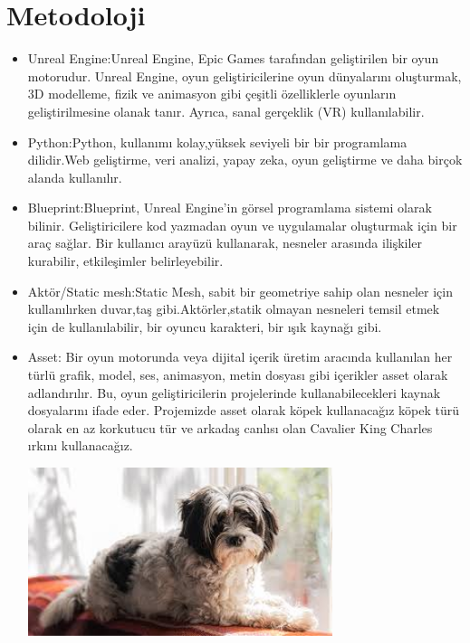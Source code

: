 \documentclass[12pt,a4paper]{article}
\begin{document}
		\section{Metodoloji} 
		\begin{itemize}
			\item Unreal Engine:Unreal Engine, Epic Games tarafından geliştirilen bir oyun motorudur. Unreal Engine, oyun geliştiricilerine oyun dünyalarını oluşturmak, 3D modelleme, fizik ve animasyon gibi çeşitli özelliklerle oyunların geliştirilmesine olanak tanır. Ayrıca, sanal gerçeklik (VR) kullanılabilir. 
			\item Python:Python, kullanımı kolay,yüksek seviyeli bir bir programlama dilidir.Web geliştirme, veri analizi, yapay zeka, oyun geliştirme ve daha birçok alanda kullanılır. 
			\item Blueprint:Blueprint, Unreal Engine'in görsel programlama sistemi olarak bilinir. Geliştiricilere kod yazmadan oyun ve uygulamalar oluşturmak için bir araç sağlar. Bir kullanıcı arayüzü kullanarak, nesneler arasında ilişkiler kurabilir, etkileşimler belirleyebilir.
		     	\item Aktör/Static mesh:Static Mesh, sabit bir geometriye sahip olan nesneler için kullanılırken duvar,taş gibi.Aktörler,statik olmayan nesneleri temsil etmek için de kullanılabilir, bir oyuncu karakteri, bir ışık kaynağı gibi.
			\item Asset: Bir oyun motorunda veya dijital içerik üretim aracında kullanılan her türlü grafik, model, ses, animasyon, metin dosyası gibi içerikler asset olarak adlandırılır. Bu, oyun geliştiricilerin projelerinde kullanabilecekleri kaynak dosyalarını ifade eder.\newline 
			 Projemizde asset olarak köpek kullanacağız köpek türü olarak en az korkutucu tür ve arkadaş canlısı olan Cavalier King Charles ırkını kullanacağız.\newline\newline
			 \begin{center}
			 	\includegraphics[width=0.7\textwidth,center]{images/images.jpeg}\newline\newline
			 \end{center}
			 

\end{itemize}
\end{document}
